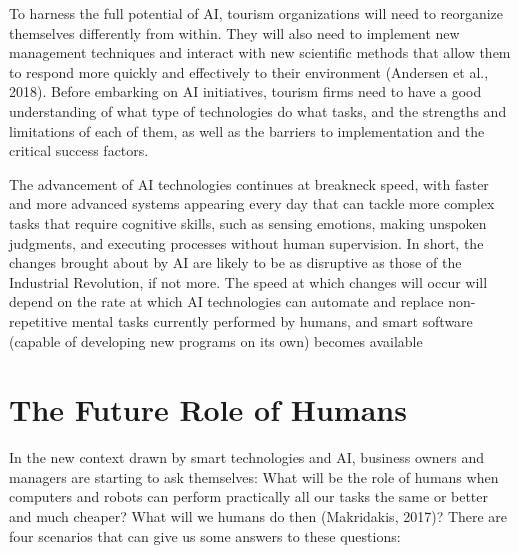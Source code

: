 \documentclass[
  letterpaper,
  DIV=11,
  numbers=noendperiod]{scrreprt}
\begin{document}
To harness the full potential of AI, tourism organizations will need to
reorganize themselves differently from within. They will also need to
implement new management techniques and interact with new scientific
methods that allow them to respond more quickly and effectively to their
environment (Andersen et al., 2018). Before embarking on AI initiatives,
tourism firms need to have a good understanding of what type of
technologies do what tasks, and the strengths and limitations of each of
them, as well as the barriers to implementation and the critical success
factors.

The advancement of AI technologies continues at breakneck speed, with
faster and more advanced systems appearing every day that can tackle
more complex tasks that require cognitive skills, such as sensing
emotions, making unspoken judgments, and executing processes without
human supervision. In short, the changes brought about by AI are likely
to be as disruptive as those of the Industrial Revolution, if not more.
The speed at which changes will occur will depend on the rate at which
AI technologies can automate and replace non-repetitive mental tasks
currently performed by humans, and smart software (capable of developing
new programs on its own) becomes available

\hypertarget{the-future-role-of-humans}{%
\section{The Future Role of Humans}\label{the-future-role-of-humans}}

In the new context drawn by smart technologies and AI, business owners
and managers are starting to ask themselves: What will be the role of
humans when computers and robots can perform practically all our tasks
the same or better and much cheaper? What will we humans do then
(Makridakis, 2017)? There are four scenarios that can give us some
answers to these questions:
\end{document}
